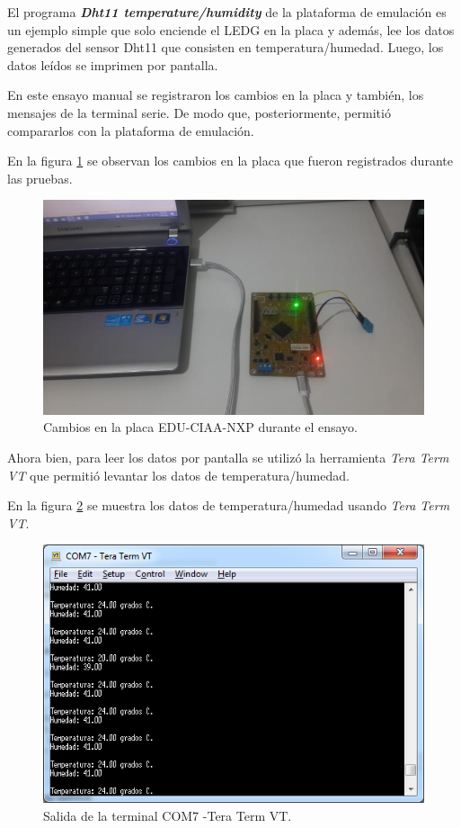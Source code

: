 El programa \textit{\textbf{Dht11 temperature/humidity}} de la plataforma de emulación es un ejemplo simple que solo enciende el LEDG en la placa y además, lee los datos generados del sensor Dht11 que consisten en temperatura/humedad. Luego, los datos leídos se imprimen por pantalla. 

En este ensayo manual se registraron los cambios en la placa y también, los mensajes de la terminal serie. De modo que, posteriormente, permitió compararlos con la plataforma de emulación.

En la figura \ref{fig:TestPlaca} se observan los cambios en la placa que fueron registrados durante las pruebas.


\begin{figure}[ht]
	\centering
	\includegraphics[scale=.50]{./Figures/TestPlaca.jpeg}
	\caption{Cambios en la placa EDU-CIAA-NXP durante el ensayo.}
	\label{fig:TestPlaca}
\end{figure}


Ahora bien, para leer los datos por pantalla se utilizó la herramienta \textit{Tera Term VT} que permitió levantar los datos de temperatura/humedad.

En la figura \ref{fig:TestTerminal} se muestra los datos de temperatura/humedad usando \textit{Tera Term VT}. 


\begin{figure}[ht]
	\centering
	\includegraphics[scale=.80]{./Figures/TestTerminal.png}
	\caption{Salida de la terminal COM7 -Tera Term VT.}
	\label{fig:TestTerminal}
\end{figure}



